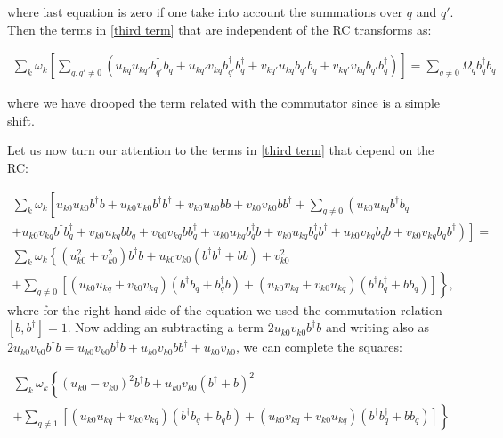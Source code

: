 \documentclass[%
preprint,
onecolumn,
notitlepag,
 amsmath,amssymb,
 aps,
 pra,
]{revtex4-2}
\begin{document}
where last equation is zero if one take into account the summations over $q$ and $q'$. Then  
the terms in \eqref{third term} that are independent of the RC transforms as:

\begin{multline}
    \sum_{k} \omega_{k} \left[\sum_{q,q' \neq 0} \left( u_{kq } u_{kq' }  b_{q'}^{\dagger} b_q + u_{kq' } v_{kq }  b_{q'}^{\dagger} b_q^{\dagger}  + v_{kq' } u_{kq }  b_{q'} b_q + v_{kq' } v_{kq }  b_{q'} b_q ^{\dagger}\right) \right] =\sum_{q\neq 0}  \Omega_{q} b_{q}^{\dagger} b_{q} 
    \label{eq:R1}
\end{multline}

where we have drooped the term related with the commutator since is a simple shift.

Let us now turn our attention to the terms in \eqref{third term} that depend on the RC: 



\begin{multline}
\sum_{k}\omega_{k}\left[
u_{k0} u_{k0} b^{\dagger} b + u_{k0} v_{k0} b^{\dagger} b^{\dagger} +
 v_{k0} u_{k0} b b + v_{k0} v_{k0} b b^{\dagger} + \sum_{q \neq 0 } \left( u_{k0 } u_{kq } b^{\dagger} b_q \right. \right. \\ 
 \left. \left. + u_{k0 } v_{kq } b^{\dagger} b_q^{\dagger} + v_{k0 } u_{kq } b b_q + v_{k0 } v_{kq } b b_q^{\dagger} +  u_{k0 } u_{kq } b_q^{\dagger} b + v_{k0 } u_{kq } b_q^{\dagger} b^{\dagger} + u_{k0} v_{kq } b_q b + v_{k0 } v_{kq } b_q b^{\dagger}\right)
     \right] = \\
     \sum_{k}\omega_{k}\left\{ (u_{k0}^2 + v_{k0}^2) b^{\dagger} b + u_{k0} v_{k0} (b^{\dagger} b^{\dagger} + b b) + v_{k0}^2 \right.\\ 
     \left. + \sum_{q \neq 0 }\left[ (u_{k0 } u_{kq } + v_{k0 } v_{kq})( b^{\dagger} b_{q} + b_{q}^{\dagger} b)+ (u_{k0} v_{kq} + v_{k0} u_{kq}) ( b^{\dagger} b_{q}^{\dagger} + b b_{q}) \right]\right\},
\end{multline}
where for the right hand side of the equation we used the commutation relation $[b,b^{\dagger}] = 1$. Now adding an subtracting a  term $2  u_{k0} v_{k0} b^{\dagger} b $ and writing also as $2  u_{k0} v_{k0} b^{\dagger} b =  u_{k0} v_{k0} b^{\dagger} b+ u_{k0} v_{k0}b b^{\dagger} + u_{k0} v_{k0}  $, we can complete the squares:

\begin{equation}
\begin{array}{c}
\sum_{k} \omega_{k}\left\{\left(u_{k 0}-v_{k 0}\right)^2 b^{\dagger} b+u_{k 0} v_{k 0}\left(b^{\dagger}+b \right)^2 \right. \\
\left.+\sum_{q \neq 1}\left[\left(u_{k 0} u_{k q}+v_{k 0} v_{k q}\right)\left(b^{\dagger} b_{q}+b_{q}^{\dagger} b\right)+\left(u_{k 0} v_{k q}+v_{k 0} u_{k q}\right)\left(b^{\dagger} b_{q}^{\dagger}+b b_{q}\right)\right]\right\}
\end{array}
\end{equation}
\end{document}
